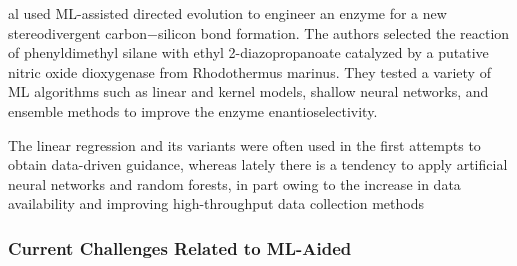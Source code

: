 \documentclass[12pt]{article}
\begin{document}
al\cite{71} used ML-assisted directed evolution to engineer an enzyme for a new stereodivergent carbon−silicon bond formation. The authors selected the reaction of phenyldimethyl silane with ethyl 2-diazopropanoate catalyzed by a putative nitric oxide dioxygenase from Rhodothermus marinus. They tested a variety of ML algorithms such as linear and kernel models, shallow neural networks, and ensemble methods to improve the enzyme enantioselectivity.

The linear regression and its variants were often used in the ﬁrst attempts to obtain data-driven guidance, whereas lately there is a tendency to apply artiﬁcial neural networks and random forests, in part owing to the increase in data availability and improving high-throughput data collection methods

\subsubsection{Current Challenges Related to ML-Aided}
\end{document}
